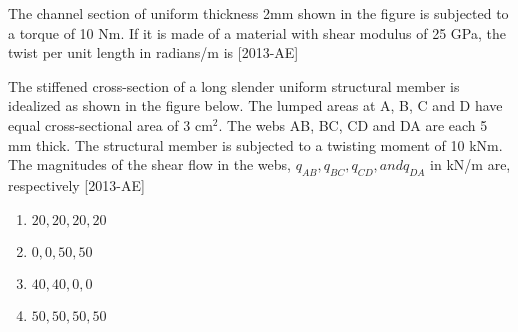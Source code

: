    \item The channel section of uniform thickness 2mm shown in the figure is subjected to a torque of 10 Nm. If it is made of a material with shear modulus of 25 GPa, the twist per unit length in radians/m is \underline{\hspace{2cm}} \hfill{[2013-AE]}
    \begin{figure}[!ht]
    \centering

    \label{fig:my_label}
    \end{figure}

    \item The stiffened cross-section of a long slender uniform structural member is idealized as shown in the figure below. The lumped areas at A, B, C and D have equal cross-sectional area of 3 cm$^2$. The webs AB, BC, CD and DA are each 5 mm thick. The structural member is subjected to a twisting moment of 10 kNm. The magnitudes of the shear flow in the webs, $q_{AB}, q_{BC}, q_{CD}, and q_{DA}$ in kN/m are, respectively \hfill{[2013-AE]}
    \begin{figure}[!ht]
\centering
{}%

\label{fig:my_label}
\end{figure}

    \begin{enumerate}
        \item $20, 20, 20, 20$
        \item $0, 0, 50, 50$
        \item $40, 40, 0, 0$
        \item $50, 50, 50, 50$
    \end{enumerate}


